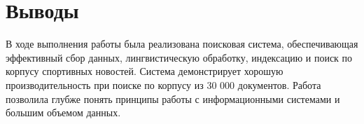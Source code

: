 \section{Выводы}

В ходе выполнения работы была реализована поисковая система, обеспечивающая эффективный сбор данных, лингвистическую обработку, индексацию и поиск по корпусу спортивных новостей. Система демонстрирует хорошую производительность при поиске по корпусу из 30 000 документов. Работа позволила глубже понять принципы работы с информационными системами и большим объемом данных.
